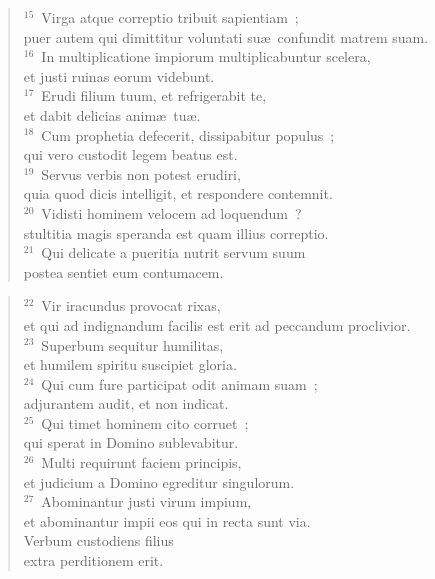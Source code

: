 \begin{flushleft}\begin{verse}${}^{15}$~Virga atque correptio tribuit sapientiam~;\\ puer autem qui dimittitur voluntati su\ae\ confundit matrem suam.\\
${}^{16}$~In multiplicatione impiorum multiplicabuntur scelera,\\ et justi ruinas eorum videbunt.\\
${}^{17}$~Erudi filium tuum, et refrigerabit te,\\ et dabit delicias anim\ae\ tu\ae .\\
${}^{18}$~Cum prophetia defecerit, dissipabitur populus~;\\ qui vero custodit legem beatus est.\\
${}^{19}$~Servus verbis non potest erudiri,\\ quia quod dicis intelligit, et respondere contemnit.\\
${}^{20}$~Vidisti hominem velocem ad loquendum~?\\ stultitia magis speranda est quam illius correptio.\\
${}^{21}$~Qui delicate a pueritia nutrit servum suum\\ postea sentiet eum contumacem.\end{verse}\end{flushleft}


\begin{flushleft}\begin{verse}${}^{22}$~Vir iracundus provocat rixas,\\ et qui ad indignandum facilis est erit ad peccandum proclivior.\\
${}^{23}$~Superbum sequitur humilitas,\\ et humilem spiritu suscipiet gloria.\\
${}^{24}$~Qui cum fure participat odit animam suam~;\\ adjurantem audit, et non indicat.\\
${}^{25}$~Qui timet hominem cito corruet~;\\ qui sperat in Domino sublevabitur.\\
${}^{26}$~Multi requirunt faciem principis,\\ et judicium a Domino egreditur singulorum.\\
${}^{27}$~Abominantur justi virum impium,\\ et abominantur impii eos qui in recta sunt via.\\ Verbum custodiens filius\\ extra perditionem erit.\end{verse}\end{flushleft}



